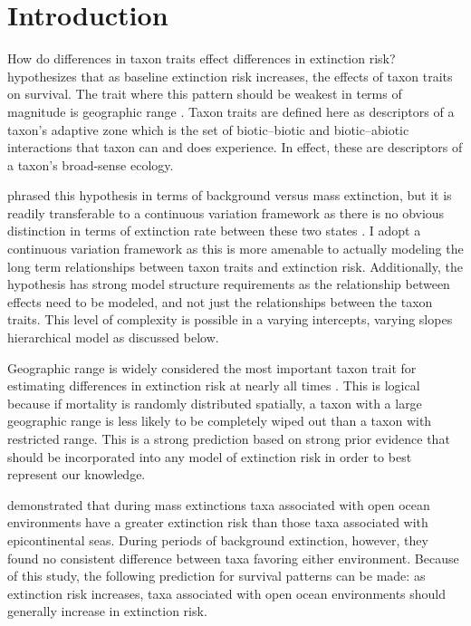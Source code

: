 \documentclass[12pt,letterpaper]{article}
\begin{document}
\section{Introduction}

How do differences in taxon traits effect differences in extinction risk? \citet{Jablonski1987} hypothesizes that as baseline extinction risk increases, the effects of taxon traits on survival. The trait where this pattern should be weakest in terms of magnitude is geographic range \citep{Jablonski1987}. Taxon traits are defined here as descriptors of a taxon's adaptive zone which is the set of biotic--biotic and biotic--abiotic interactions that taxon can and does experience. In effect, these are descriptors of a taxon's broad-sense ecology.

\citet{Jablonski1987} phrased this hypothesis in terms of background versus mass extinction, but it is readily transferable to a continuous variation framework as there is no obvious distinction in terms of extinction rate between these two states \citep{Wang2003}. I adopt a continuous variation framework as this is more amenable to actually modeling the long term relationships between taxon traits and extinction risk. Additionally, the \citet{Jablonski1987} hypothesis has strong model structure requirements as the relationship between effects need to be modeled, and not just the relationships between the taxon traits. This level of complexity is possible in a varying intercepts, varying slopes hierarchical model as discussed below.

Geographic range is widely considered the most important taxon trait for estimating differences in extinction risk at nearly all times \citep{Jablonski1986,Jablonski1987,Jablonski2003,Payne2007}. This is logical because if mortality is randomly distributed spatially, a taxon with a large geographic range is less likely to be completely wiped out than a taxon with restricted range. This is a strong prediction based on strong prior evidence that should be incorporated into any model of extinction risk in order to best represent our knowledge.

\citet{Miller2009a} demonstrated that during mass extinctions taxa associated with open ocean environments have a greater extinction risk than those taxa associated with epicontinental seas. During periods of background extinction, however, they found no consistent difference between taxa favoring either environment. Because of this study, the following prediction for survival patterns can be made: as extinction risk increases, taxa associated with open ocean environments should generally increase in extinction risk.
\end{document}
